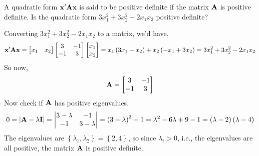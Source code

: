         A quadratic form $\bold{x}^\prime \bold{A} \bold{x}$ is said to be positive definite if the matrix $\bold{A}$ is positive definite.
        Is the quadratic form $3x_1^2 + 3x_2^2 - 2x_1x_2$ positive definite?
        \par
        Converting $3x_1^2 + 3x_2^2 - 2x_1x_2$ to a matrix, we'd have,
        \[
            \bold{x}^\prime \bold{A} \bold{x} 
            =
            \begin{bmatrix}
                x_1 & x_2
            \end{bmatrix}
            \begin{bmatrix}
                3 & -1 \\
                -1 & 3
            \end{bmatrix}
            \begin{bmatrix}
                x_1 \\
                x_2
            \end{bmatrix}
            =
            x_1\left(3x_1 - x_2\right) + x_2\left(-x_1+3x_2\right)
            =
            3x_1^2 + 3x_2^2 - 2x_1x_2
        \]
        So now,
        \[
            \bold{A}
            =
            \begin{bmatrix}
                3 & -1 \\
                -1 & 3
            \end{bmatrix}
        \]
        Now check if $\bold{A}$ has positive eigenvalues,
        \[
            0
            =
            \left|\bold{A} - \lambda \bold{I}\right|
            =
            \left|
            \begin{matrix}
                3 - \lambda & -1 \\
                -1 & 3 - \lambda
            \end{matrix}
            \right|
            =
            \left(3 - \lambda\right)^2 - 1
            =
            \lambda^2 - 6\lambda + 9 - 1
            =
            \left(\lambda - 2\right)\left(\lambda - 4\right)
        \]
        The eigenvalues are $\left\{\lambda_1,\lambda_2\right\} = \left\{2,4\right\}$, so since $\lambda_i > 0$, i.e., the eigenvalues are all positive, the matrix $\bold{A}$ is positive definite.